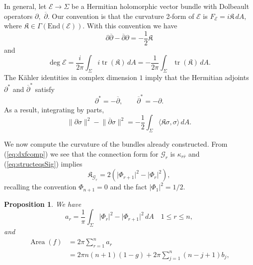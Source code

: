 \documentclass[11pt]{article}
\newtheorem{prop}[theorem]{Proposition}
\theoremstyle{definition}
\numberwithin{equation}{section}
\begin{document}
\indent \indent In general, let $\mathcal{E} \to \Sigma$ be a Hermitian holomorphic vector bundle with Dolbeault operators $\partial,$ $\overline{\partial}.$ Our convention is that the curvature 2-form of $\mathcal{E}$ is $F_{\mathcal{E}} = i \mathfrak{K} \,dA$, where $\mathfrak{K} \in \Gamma(\mathrm{End}(\mathcal{E}))$.
With this convention we have
\begin{equation}\label{eq:curvcommute}
	\partial \overline{\partial} - \overline{\partial} \partial = -\frac{1}{2} \mathfrak{K}
\end{equation}
and
\begin{equation}\label{eq:degform}
	\deg \mathcal{E} = \frac{i}{2 \pi} \int_{\Sigma} i \operatorname{tr}(\mathfrak{K}) \, dA = -\frac{1}{2\pi} \int_{\Sigma} \operatorname{tr} (\mathfrak{K}) \, dA.
\end{equation}
The K\"ahler identities in complex dimension $1$ imply that the Hermitian adjoints $\partial^*$ and $\overline{\partial}^*$ satisfy
\begin{equation*}
	\partial^* = - \overline{\partial}, \qquad \overline{\partial}^* = - \partial.
\end{equation*}
As a result, integrating by parts,
\begin{equation}\label{eq:curvintbyparts}
	\lVert \partial \sigma \rVert^2 - \lVert \overline{\partial} \sigma \rVert^2 = -\frac{1}{2} \int_{\Sigma} \langle \mathfrak{K} \sigma, \sigma \rangle \, d A.
\end{equation}

We now compute the curvature of the bundles already constructed. From (\ref{eq:dxfcomp}) we see that the connection form for $\mathcal{G}_r$ is $\kappa_{r \overline{r}}$ and (\ref{eq:structeqsSig}) implies
\begin{equation}
	\mathfrak{K}_{\mathcal{G}_r} = 2 \left(\lvert \Phi_{r+1} \rvert^2 - \lvert \Phi_{r} \rvert^2 \right), \label{eq:Grcurv}
\end{equation}
recalling the convention $\Phi_{n+1} = 0$ and the fact $\lvert \Phi_1 \rvert^2 = 1/2.$

\begin{prop}
	We have
	\begin{equation*}
		a_r = \frac{1}{\pi} \int_{\Sigma} \lvert \Phi_r \rvert^2 - \lvert \Phi_{r+1} \rvert^2 \, dA \quad 1 \leq r \leq n,
	\end{equation*}
	and
	\begin{align}
		\operatorname{Area}(f) & = 2 \pi \sum_{r=1}^{n} a_r \label{eq:areaformula}  \\
        & = 2 \pi n(n+1)(1-g) + 2 \pi \sum_{j=1}^{n} (n-j+1)b_j, \label{eq:areaformularamified}
	\end{align}
\end{prop}
\end{document}
